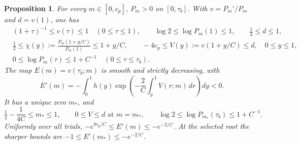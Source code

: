 \documentclass[11pt]{article}
\newtheorem{proposition}{Proposition}
\begin{document}
\begin{proposition}\label{prop:shoot}
For every $m\in[0,c_p]$, $P_m>0$ on $[0,\tau_b]$. With
$v=P_m'/P_m$ and $d=v(1)$, one has
\begin{align}
 &(1+\tau)^{-1}\leq v(\tau)\leq1\quad(0\leq\tau\leq1),
 \qquad \log2\leq\log P_m(1)\leq1,\qquad \tfrac12\leq d\leq1,
 \\
 &\tfrac12\leq\chi(y):=\frac{P_m(1+y/C)}{P_m(1)}
 \leq1+y/C,\qquad -4c_p\leq V(y):=v(1+y/C)\leq d,
 \quad0\leq y\leq1,\\
 &0\leq\log P_m(\tau)\leq1+C^{-1}\quad(0\leq\tau\leq\tau_b).
\end{align}
The map $E(m)=v(\tau_b;m)$ is smooth and strictly decreasing, with
\begin{equation}\label{eq:rootderivative}
 E'(m)=-\int_0^1 h(y)
 \exp\!\left(-\frac2C\int_y^1V(r;m)\,dr\right)dy<0.
\end{equation}
It has a unique zero $m_*$, and
\[
 \tfrac12-\frac1{4C}\leq m_*\leq1,\qquad
 0\leq V\leq d\text{ at }m=m_*,\qquad
 \log2\leq\log P_{m_*}(\tau_b)\leq1+C^{-1}.
\]
Uniformly over all trials,
$-e^{8c_p/C}\leq E'(m)\leq-e^{-2/C}$.
At the selected root the sharper bounds are
$-1\leq E'(m_*)\leq-e^{-2/C}$.
\end{proposition}
\end{document}
